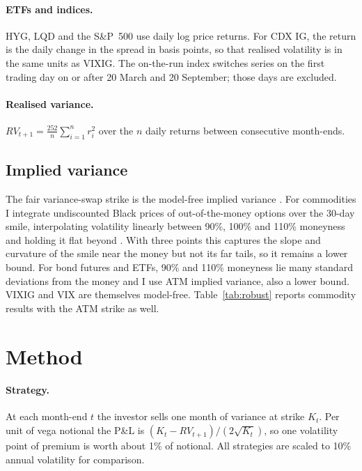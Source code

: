 \documentclass[11pt,a4paper]{article}
\theoremstyle{remark}
\begin{document}
\paragraph{ETFs and indices.} HYG, LQD and the S\&P~500 use daily log price returns. For CDX IG, the return is the daily change in the spread in basis points, so that realised volatility is in the same units as VIXIG. The on-the-run index switches series on the first trading day on or after 20 March and 20 September; those days are excluded.

\paragraph{Realised variance.} $RV_{t+1} = \frac{252}{n}\sum_{i=1}^{n} r_i^2$ over the $n$ daily returns between consecutive month-ends.

\subsection{Implied variance}
\label{sec:iv}

The fair variance-swap strike is the model-free implied variance \citep{brittenjones2000,demeterfi1999}. For commodities I integrate undiscounted Black prices of out-of-the-money options over the 30-day smile, interpolating volatility linearly between 90\%, 100\% and 110\% moneyness and holding it flat beyond \citep{jiangtian2005}. With three points this captures the slope and curvature of the smile near the money but not its far tails, so it remains a lower bound. For bond futures and ETFs, 90\% and 110\% moneyness lie many standard deviations from the money and I use ATM implied variance, also a lower bound. VIXIG and VIX are themselves model-free. Table~\ref{tab:robust} reports commodity results with the ATM strike as well.

\section{Method}
\label{sec:method}

\paragraph{Strategy.} At each month-end $t$ the investor sells one month of variance at strike $K_t$. Per unit of vega notional the P\&L is $(K_t-RV_{t+1})/(2\sqrt{K_t})$, so one volatility point of premium is worth about 1\% of notional. All strategies are scaled to 10\% annual volatility for comparison.
\end{document}

